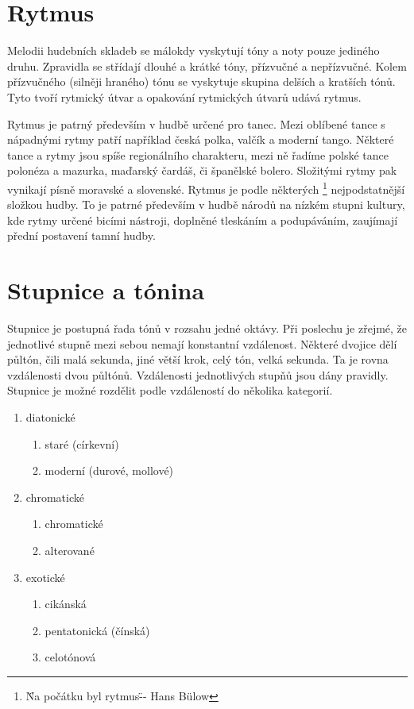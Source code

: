 \section{Rytmus}
Melodii hudebních skladeb se málokdy vyskytují tóny a noty pouze jediného druhu.
Zpravidla se střídají dlouhé a krátké tóny, přízvučné a nepřízvučné.
Kolem přízvučného (silněji hraného) tónu se vyskytuje skupina delších a kratších tónů.
Tyto tvoří rytmický útvar a opakování rytmických útvarů udává rytmus.

\par
Rytmus je patrný především v hudbě určené pro tanec.
Mezi oblíbené tance s nápadnými rytmy patří například česká polka,
valčík a moderní tango. 
Některé tance a rytmy jsou spíše regionálního charakteru, 
mezi ně řadíme polské tance polonéza a mazurka, maďarský čardáš, či španělské bolero.
Složitými rytmy pak vynikají písně moravské a slovenské.
Rytmus je podle některých
\footnote{\"Na počátku byl rytmus\" -- Hans Bülow} 
nejpodstatnější složkou hudby.
To je patrné především v hudbě národů na nízkém stupni kultury,
kde rytmy určené bicími nástroji, doplněné tleskáním a podupáváním,
zaujímají přední postavení tamní hudby.
\cite{cmiral}

\section{Stupnice a tónina}
\label{stupnice}

Stupnice je postupná řada tónů v rozsahu jedné oktávy.
Při poslechu je zřejmé, že jednotlivé stupně mezi sebou nemají konstantní vzdálenost.
\cite{kofron}
Některé dvojice dělí půltón, čili malá sekunda, 
jiné větší krok, celý tón, velká sekunda.
Ta je rovna vzdálenosti dvou půltónů.
Vzdálenosti jednotlivých stupňů jsou dány pravidly.
\cite{cmiral}
Stupnice je možné rozdělit podle vzdáleností do několika kategorií.

\begin{enumerate}
	\item diatonické
	\begin{enumerate}
        \item staré (církevní)
        \item moderní (durové, mollové)
    \end{enumerate}
	\item chromatické
	\begin{enumerate}
        \item chromatické
        \item alterované
    \end{enumerate}
	\item exotické
	\begin{enumerate}
        \item cikánská
        \item pentatonická (čínská)
        \item celotónová
    \end{enumerate}
\end{enumerate}

